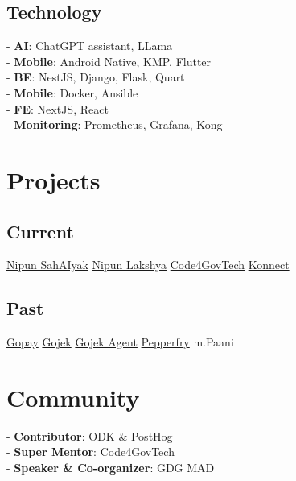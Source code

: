 \documentclass[]{deedy-resume-reversed}
\begin{document}
\begin{minipage}[t]{0.33\textwidth}
\subsection{Technology}
- {\bf AI}: ChatGPT assistant, LLama\\
- {\bf Mobile}: Android Native, KMP, Flutter \\ 
- {\bf BE}: NestJS, Django, Flask, Quart \\
- {\bf Mobile}: Docker, Ansible \\
- {\bf FE}: NextJS, React \\
- {\bf Monitoring}: Prometheus, Grafana, Kong \\
\sectionsep


\section{Projects}
\subsection{Current}
\href{https://github.com/NipunSahAIyak}{Nipun SahAIyak} \textbullet{}
\href{https://github.com/Mission-Prerna}{Nipun Lakshya} \textbullet{}
\href{https://github.com/Code4GovTech}{Code4GovTech} \textbullet{}
\href{https://github.com/Konnect-Agri}{Konnect}
\sectionsep

\subsection{Past}
\href{https://play.google.com/store/apps/details?id=com.gojek.gopay&hl=en_IN}{Gopay} \textbullet{}
\href{https://play.google.com/store/apps/details?id=com.gojek.app&hl=en_IN}{Gojek} \textbullet{}
\href{https://play.google.com/store/apps/details?id=com.gojek.agent&hl=en_IN}{Gojek Agent} \textbullet{}
\href{https://play.google.com/store/apps/details?id=com.app.pepperfry&hl=en_IN}{Pepperfry} \textbullet{}
m.Paani\\


\section{Community}
- {\bf Contributor}: ODK \& PostHog \\
- {\bf Super Mentor}: Code4GovTech \\
- {\bf Speaker \& Co-organizer}: GDG MAD
\sectionsep


\end{minipage}
\end{document}
